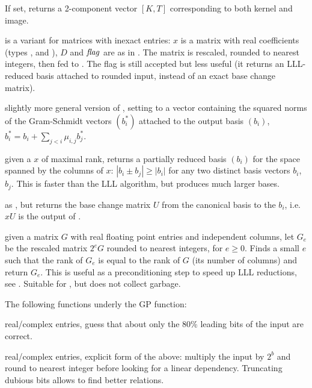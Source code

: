 \item  {} If set, returns a 2-component vector $[K, T]$
corresponding to both kernel and image.


 is a variant for matrices
with inexact entries: $x$ is a matrix with real coefficients (types
,  and ), $D$ and $\hbox{\it f\kern0pt lag\/}$ are as in .
The matrix is rescaled, rounded to nearest integers, then fed to
. The flag  is still accepted but less useful
(it returns an LLL-reduced basis attached to rounded input, instead of an
exact base change matrix).

 slightly more
general version of , setting  to a vector containing
the squared norms of the Gram-Schmidt vectors $(b_i^*)$ attached to the
output basis $(b_i)$, $b_i^* = b_i + \sum_{j < i} \mu_{i,j} b_j^*$.


 given a  $x$ of maximal rank,
returns a partially reduced basis $(b_i)$ for the space spanned by the
columns of $x$: $|b_i \pm b_j| \geq |b_i|$ for any two distinct basis vectors
$b_i$, $b_j$. This is faster than the LLL algorithm, but produces much larger
bases.

 as , but returns
the base change matrix $U$ from the canonical basis to the $b_i$, i.e. $x U$
is the output of .

 given a matrix $G$ with real floating
point entries and independent columns, let $G_e$ be the
rescaled matrix $2^e G$ rounded to nearest integers, for $e \geq 0$.
Finds a small $e$ such that the rank of $G_e$ is equal to the rank of $G$
(its number of columns) and return $G_e$. This is useful as a preconditioning
step to speed up LLL reductions, see .
Suitable for , but does not collect garbage.


The following functions underly the  GP function:

 real/complex entries, guess that about only the
80\% leading bits of the input are correct.

 real/complex entries, explicit form of the
above: multiply the input by $2^b$ and round to nearest integer before
looking for a linear dependency. Truncating dubious bits allows to find
better relations.

